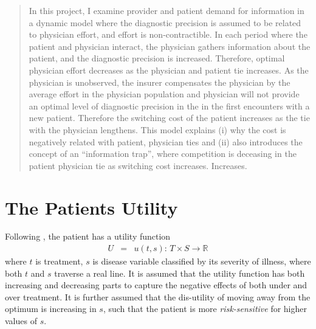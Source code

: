 \documentclass[10pt,a4paper]{article} %
\begin{document}
\maketitle


\begin{abstract}
In this project, I examine provider and patient demand for information in a dynamic model where the diagnostic precision is assumed to be related to physician effort, and effort is non-contractible. In each period where the patient and physician interact, the physician gathers information about the patient, and the diagnostic precision is increased. Therefore, optimal physician effort decreases as the physician and patient tie increases. As the physician is unobserved, the insurer compensates the physician by the average effort in the physician population and physician will not provide an optimal level of diagnostic precision in the in the first encounters with a new patient. Therefore the switching cost of the patient increases as the tie with the physician lengthens. This model explains (i) why the cost is negatively related with patient, physician ties and (ii) also introduces the concept of an ``information trap'', where competition is deceasing in the patient physician tie as switching cost increases. Increases.
\end{abstract}


\section{The Patients Utility}

Following \citet{Rochaix1989}, the patient has a utility function
\begin{eqnarray*}
U & = & u(t,s):\, T\times S\rightarrow\mathbb{R}
\end{eqnarray*}
 where $t$ is treatment, $s$ is disease variable classified by its severity of illness, where both $t$ and $s$ traverse a real line. It is assumed that the utility function has both increasing and decreasing parts to capture the negative effects of both under and over treatment. It is further assumed that the dis-utility of moving away from the optimum is increasing in $s$, such that the patient is more \emph{risk-sensitive} for higher values of $s$.
\end{document}
